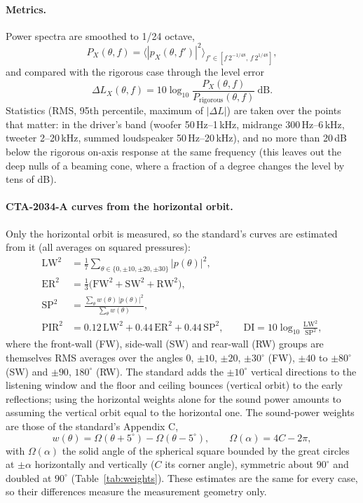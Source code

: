 \documentclass[11pt,a4paper]{article}
\begin{document}
\paragraph{Metrics.} Power spectra are smoothed to 1/24 octave,
\begin{equation}
  P_X(\theta,f)=\big\langle|p_X(\theta,f')|^2\big\rangle_{f'\in[f\,2^{-1/48},\,f\,2^{1/48}]},
\end{equation}
and compared with the rigorous case through the level error
\begin{equation}
  \Delta L_X(\theta,f)=10\log_{10}\frac{P_X(\theta,f)}{P_\text{rigorous}(\theta,f)}\ \text{dB}.
\end{equation}
Statistics (RMS, 95th percentile, maximum of $|\Delta L|$) are taken over the points that matter: in
the driver's band (woofer 50\,Hz--1\,kHz, midrange 300\,Hz--6\,kHz, tweeter 2--20\,kHz, summed
loudspeaker 50\,Hz--20\,kHz), and no more than 20\,dB below the rigorous on-axis response at the same
frequency (this leaves out the deep nulls of a beaming cone, where a fraction of a degree changes the
level by tens of dB).

\paragraph{CTA-2034-A curves from the horizontal orbit.} Only the horizontal orbit is measured, so the
standard's curves \cite{cta2034} are estimated from it (all averages on squared pressures):
\begin{align}
  \mathrm{LW}^2&=\tfrac17\textstyle\sum_{\theta\in\{0,\pm10,\pm20,\pm30\}}|p(\theta)|^2,\\
  \mathrm{ER}^2&=\tfrac13\big(\mathrm{FW}^2+\mathrm{SW}^2+\mathrm{RW}^2\big),\\
  \mathrm{SP}^2&=\frac{\sum_\theta w(\theta)\,|p(\theta)|^2}{\sum_\theta w(\theta)},\\
  \mathrm{PIR}^2&=0.12\,\mathrm{LW}^2+0.44\,\mathrm{ER}^2+0.44\,\mathrm{SP}^2,\qquad
  \mathrm{DI}=10\log_{10}\frac{\mathrm{LW}^2}{\mathrm{SP}^2},
\end{align}
where the front-wall (FW), side-wall (SW) and rear-wall (RW) groups are themselves RMS averages
over the angles $0$, $\pm10$, $\pm20$, $\pm30^\circ$ (FW), $\pm40$ to $\pm80^\circ$ (SW) and $\pm90$,
$180^\circ$ (RW). The standard adds the
$\pm10^\circ$ vertical directions to the listening window and the floor and ceiling bounces (vertical
orbit) to the early reflections; using the horizontal weights alone for the sound power amounts to
assuming the vertical orbit equal to the horizontal one. The sound-power weights are those of the
standard's Appendix C,
\begin{equation}
  w(\theta)=\Omega(\theta+5^\circ)-\Omega(\theta-5^\circ),\qquad \Omega(\alpha)=4C-2\pi,
\end{equation}
with $\Omega(\alpha)$ the solid angle of the spherical square bounded by the great circles at $\pm\alpha$ horizontally and
vertically ($C$ its corner angle), symmetric about $90^\circ$ and doubled at $90^\circ$
(Table~\ref{tab:weights}). These estimates are the same for every case, so their differences measure
the measurement geometry only.
\end{document}
